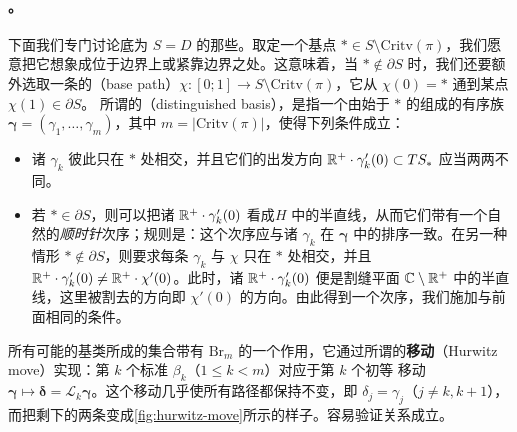 \paragraph{\trDistinguishedBasis{}。}\label{sub:distinguished-bases}
下面我们专门讨论底为\trDisk{} $S=D$ 的那些\trExact\trLefschetzFibration。取定一个基点 $*\in S\setminus\mathrm{Critv}(\pi)$，我们愿意把它想象成位于边界上或紧靠边界之处。这意味着，当 $*\notin\partial S$ 时，我们还要额外选取一条\trEmbedding{}的\textbf{\trBasePath}（base path）$\chi\colon[0;1]\to S\setminus\mathrm{Critv}(\pi)$，它从 $\chi(0)=*$ 通到某点 $\chi(1)\in\partial S$。
所谓\trVanishingPath{}的\textbf{\trDistinguishedBasis}（distinguished basis），是指一个由始于 $*$ 的\trVanishingPath{}组成的有序族 $\boldsymbol{\gamma}=(\gamma_1,\ldots,\gamma_m)$，其中 $m=|\mathrm{Critv}(\pi)|$，使得下列条件成立：
\begin{itemize}
\item 诸 $\gamma_k$ 彼此只在 $*$ 处相交，并且它们的出发方向 $\mathbb{R}^+\cdot\gamma_k'(0)\subset TS_*$ 应当两两不同。
\item 若 $*\in\partial S$，则可以把诸 $\mathbb{R}^+\cdot\gamma_k'(0)$ 看成\trUpperHalfPlane{}$H$ 中的\trRadial{}半直线，从而它们带有一个自然的\emph{顺时针}次序；规则是：这个次序应与诸 $\gamma_k$ 在 $\boldsymbol{\gamma}$ 中的排序一致。在另一种情形 $*\notin\partial S$，则要求每条 $\gamma_k$ 与 $\chi$ 只在 $*$ 处相交，并且 $\mathbb{R}^+\cdot\gamma_k'(0)\neq\mathbb{R}^+\cdot\chi'(0)$。此时，诸 $\mathbb{R}^+\cdot\gamma_k'(0)$ 便是割缝平面 $\mathbb{C}\setminus\mathbb{R}^+$ 中的\trRadial{}半直线，这里被割去的方向即 $\chi'(0)$ 的方向。由此得到一个次序，我们施加与前面相同的条件。
\end{itemize}
所有可能的\trIsotopy{}基类所成的集合带有\trBraidGroup{} $\mathrm{Br}_m$ 的一个作用，它通过所谓的\textbf{\trHurwitz{}移动}（Hurwitz move）实现：第 $k$ 个标准\trGenerator{} $\beta_k$（$1\le k<m$）对应于第 $k$ 个初等 \trHurwitz{}移动 $\boldsymbol{\gamma}\mapsto\boldsymbol{\delta}=\mathscr{L}_k\boldsymbol{\gamma}$。这个移动几乎使所有路径都保持不变，即 $\delta_j=\gamma_j$（$j\neq k,k+1$），而把剩下的两条变成\cref{fig:hurwitz-move}所示的样子。容易验证\trBraidGroup{}关系成立。
